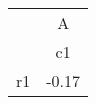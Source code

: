 \begin{tabular}{l*{1}{c}}
\hline\hline
            &           A\\
            &          c1\\
\hline
r1          &       -0.17\\
\hline\hline
\end{tabular}
